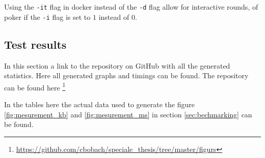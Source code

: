 \documentclass[twoside,11pt,openright]{report}
\begin{document}
\begin{appendices}
Using the \verb|-it| flag in docker instead of the \verb|-d| flag allow for interactive rounds, of poker if the \verb|-i| flag is set to $1$ instead of $0$.


\subsection{Test results}
\label{app:test-res}
In this section a link to the repository on GitHub with all the generated statistics. Here all generated graphs and timings can be found. The repository can be found here \footnote{\url{https://github.com/cbobach/speciale_thesis/tree/master/figurs}}

\bigskip

In the tables here the actual data used to generate the figure \ref{fig:mesurement_kb} and \ref{fig:mesurement_ms} in section \ref{sec:bechmarking} can be found.

\begin{table}
\centering

    \begin{subtable}{\textwidth}
    \label{table:const_kb}
    \centering
    \caption{$Constructor$}
    \end{subtable}%
    
    \vspace*{.5cm}
    
    \begin{subtable}{\textwidth}
    \label{table:eval_kb}
    \centering
    \caption{$Evaluator$}
    \end{subtable}%


\end{table}
\end{appendices}
\end{document}

